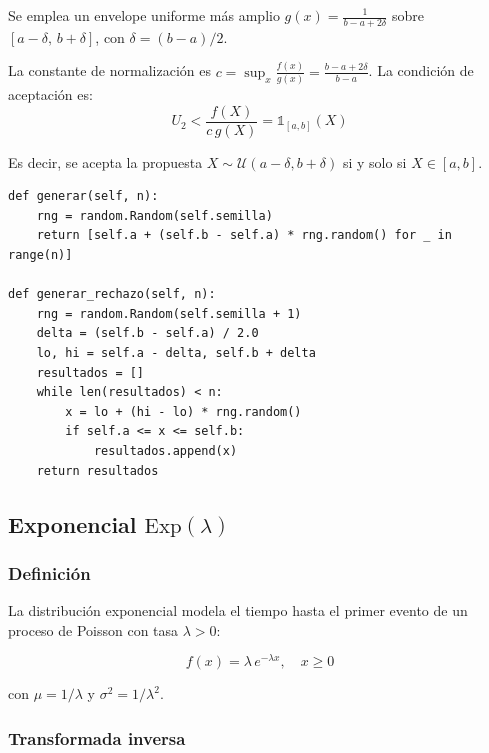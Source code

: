 \documentclass[a4paper, 11pt]{article}
\begin{document}
Se emplea un envelope uniforme más amplio $g(x) = \frac{1}{b-a+2\delta}$ sobre
$[a-\delta,\, b+\delta]$, con $\delta = (b-a)/2$.

La constante de normalización es $c = \sup_x \frac{f(x)}{g(x)} = \frac{b-a+2\delta}{b-a}$.
La condición de aceptación es:
\begin{equation}
  U_2 < \frac{f(X)}{c\,g(X)} = \mathbb{1}_{[a,b]}(X)
\end{equation}

Es decir, se acepta la propuesta $X \sim \mathcal{U}(a-\delta, b+\delta)$ si y solo
si $X \in [a, b]$.

\begin{lstlisting}[style=python, caption={Generador uniforme — transformada inversa y rechazo.}]
def generar(self, n):
    rng = random.Random(self.semilla)
    return [self.a + (self.b - self.a) * rng.random() for _ in range(n)]

def generar_rechazo(self, n):
    rng = random.Random(self.semilla + 1)
    delta = (self.b - self.a) / 2.0
    lo, hi = self.a - delta, self.b + delta
    resultados = []
    while len(resultados) < n:
        x = lo + (hi - lo) * rng.random()
        if self.a <= x <= self.b:
            resultados.append(x)
    return resultados
\end{lstlisting}


\subsection{Exponencial \texorpdfstring{$\mathrm{Exp}(\lambda)$}{Exp(lambda)}}

\subsubsection*{Definición}

La distribución exponencial modela el tiempo hasta el primer evento de un proceso
de Poisson con tasa $\lambda > 0$:

\begin{equation}
  f(x) = \lambda\,e^{-\lambda x}, \quad x \geq 0
  \label{eq:exp_pdf}
\end{equation}

con $\mu = 1/\lambda$ y $\sigma^2 = 1/\lambda^2$.

\subsubsection*{Transformada inversa}
\end{document}
